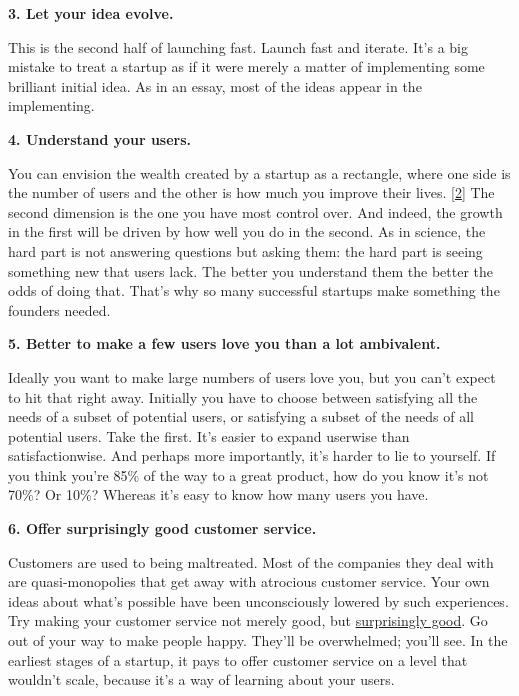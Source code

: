 \textbf{3. Let your idea evolve.}

This is the second half of launching fast.
                    Launch fast and iterate. It's a big mistake to treat a
                    startup as if it were merely a matter of implementing some
                    brilliant initial idea. As in an essay, most of the ideas
                    appear in the implementing.

\textbf{4. Understand your users.}

You can envision the wealth created by a
                    startup as a rectangle, where one side is the number of
                    users and the other is how much you improve their lives.
                    [\href{\#f2n}{2}]
                    The second dimension is the one you have most control over.
                    And indeed, the growth in the first will be driven by how
                    well you do in the second. As in science, the hard part is
                    not answering questions but asking them: the hard part is
                    seeing something new that users lack. The better you
                    understand them the better the odds of doing that. That's
                    why so many successful startups make something the founders
                    needed.

\textbf{5. Better to make a few users love you than a lot
                      ambivalent.}

Ideally you want to make large numbers of users
                    love you, but you can't expect to hit that right away.
                    Initially you have to choose between satisfying all the
                    needs of a subset of potential users, or satisfying a subset
                    of the needs of all potential users. Take the first. It's
                    easier to expand userwise than satisfactionwise. And perhaps
                    more importantly, it's harder to lie to yourself. If you
                    think you're 85\% of the way to a great product, how do you
                    know it's not 70\%? Or 10\%? Whereas it's easy to know how
                    many users you have.

\textbf{6. Offer surprisingly good customer service.}

Customers are used to being maltreated. Most of
                    the companies they deal with are quasi-monopolies that get
                    away with atrocious customer service. Your own ideas about
                    what's possible have been unconsciously lowered by such
                    experiences. Try making your customer service not merely
                    good, but
                    \href{http://www.diaryofawebsite.com/blog/2008/07/wufoo-and-the-art-of-customer-service/}{surprisingly good}. Go out of your way to make people happy. They'll be
                    overwhelmed; you'll see. In the earliest stages of a
                    startup, it pays to offer customer service on a level that
                    wouldn't scale, because it's a way of learning about your
                    users.

